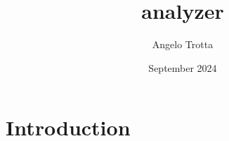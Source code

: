 \documentclass{article}
\title{analyzer}
\author{Angelo Trotta}
\date{September 2024}
\begin{document}
\maketitle

\section{Introduction}
\end{document}
